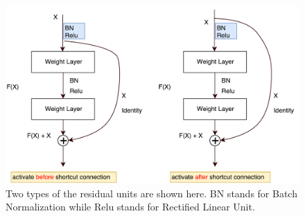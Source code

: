 \begin{figure}
    \centering
    \includegraphics[width=\textwidth,height=\textheight,keepaspectratio]{Figures/basic-resnet-structure.pdf}
    \caption[Two types of the residual units]{
        Two types of the residual units are shown here.
        BN stands for Batch Normalization while
        Relu stands for Rectified Linear Unit.
        }\label{fig:basic-resnet-structure}
\end{figure}

